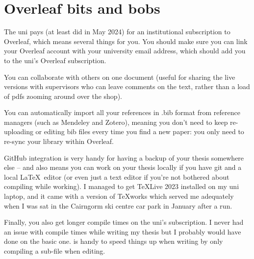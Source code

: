 \section{Overleaf bits and bobs}
The uni pays (at least did in May 2024) for an institutional subscription to Overleaf, which means several things for you. You should make sure you can link your Overleaf account with your university email address, which should add you to the uni's Overleaf subscription.

You can collaborate with others on one document (useful for sharing the live versions with supervisors who can leave comments on the text, rather than a load of pdfs zooming around over the shop).

You can automatically import all your references in .bib format from reference managers (such as Mendeley and Zotero), meaning you don't need to keep re-uploading or editing bib files every time you find a new paper: you only need to re-sync your library within Overleaf.

GitHub integration is very handy for having a backup of your thesis somewhere else -- and also means you can work on your thesis locally if you have git and a local \LaTeX\ editor (or even just a text editor if you're not bothered about compiling while working). I managed to get TeXLive 2023 installed on my uni laptop, and it came with a version of TeXworks which served me adequately when I was sat in the Cairngorm ski centre car park in January after a run.

Finally, you also get longer compile times on the uni's subscription. I never had an issue with compile times while writing my thesis but I probably would have done on the basic one. \verb|| is handy to speed things up when writing by only compiling a sub-file when editing.
